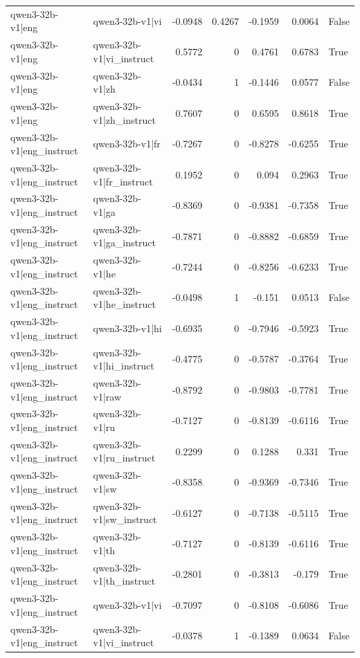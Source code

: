\begin{table}
\begin{tabular}{l l r r r r l}
qwen3-32b-v1|eng & qwen3-32b-v1|vi & -0.0948 & 0.4267 & -0.1959 & 0.0064 & False \\
qwen3-32b-v1|eng & qwen3-32b-v1|vi_instruct & 0.5772 & 0 & 0.4761 & 0.6783 & True \\
qwen3-32b-v1|eng & qwen3-32b-v1|zh & -0.0434 & 1 & -0.1446 & 0.0577 & False \\
qwen3-32b-v1|eng & qwen3-32b-v1|zh_instruct & 0.7607 & 0 & 0.6595 & 0.8618 & True \\
qwen3-32b-v1|eng_instruct & qwen3-32b-v1|fr & -0.7267 & 0 & -0.8278 & -0.6255 & True \\
qwen3-32b-v1|eng_instruct & qwen3-32b-v1|fr_instruct & 0.1952 & 0 & 0.094 & 0.2963 & True \\
qwen3-32b-v1|eng_instruct & qwen3-32b-v1|ga & -0.8369 & 0 & -0.9381 & -0.7358 & True \\
qwen3-32b-v1|eng_instruct & qwen3-32b-v1|ga_instruct & -0.7871 & 0 & -0.8882 & -0.6859 & True \\
qwen3-32b-v1|eng_instruct & qwen3-32b-v1|he & -0.7244 & 0 & -0.8256 & -0.6233 & True \\
qwen3-32b-v1|eng_instruct & qwen3-32b-v1|he_instruct & -0.0498 & 1 & -0.151 & 0.0513 & False \\
qwen3-32b-v1|eng_instruct & qwen3-32b-v1|hi & -0.6935 & 0 & -0.7946 & -0.5923 & True \\
qwen3-32b-v1|eng_instruct & qwen3-32b-v1|hi_instruct & -0.4775 & 0 & -0.5787 & -0.3764 & True \\
qwen3-32b-v1|eng_instruct & qwen3-32b-v1|raw & -0.8792 & 0 & -0.9803 & -0.7781 & True \\
qwen3-32b-v1|eng_instruct & qwen3-32b-v1|ru & -0.7127 & 0 & -0.8139 & -0.6116 & True \\
qwen3-32b-v1|eng_instruct & qwen3-32b-v1|ru_instruct & 0.2299 & 0 & 0.1288 & 0.331 & True \\
qwen3-32b-v1|eng_instruct & qwen3-32b-v1|sw & -0.8358 & 0 & -0.9369 & -0.7346 & True \\
qwen3-32b-v1|eng_instruct & qwen3-32b-v1|sw_instruct & -0.6127 & 0 & -0.7138 & -0.5115 & True \\
qwen3-32b-v1|eng_instruct & qwen3-32b-v1|th & -0.7127 & 0 & -0.8139 & -0.6116 & True \\
qwen3-32b-v1|eng_instruct & qwen3-32b-v1|th_instruct & -0.2801 & 0 & -0.3813 & -0.179 & True \\
qwen3-32b-v1|eng_instruct & qwen3-32b-v1|vi & -0.7097 & 0 & -0.8108 & -0.6086 & True \\
qwen3-32b-v1|eng_instruct & qwen3-32b-v1|vi_instruct & -0.0378 & 1 & -0.1389 & 0.0634 & False \\

\end{tabular}
\end{table}
